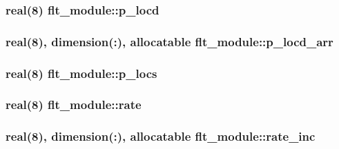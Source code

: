 \subsubsection[{p\+\_\+locd}]{\setlength{\rightskip}{0pt plus 5cm}real(8) flt\+\_\+module\+::p\+\_\+locd}\label{namespaceflt__module_a9a55926b369374d66caf682a539d8acf}
\hypertarget{namespaceflt__module_a3ae9412ace7bafcdc16443a1de523c08}{}
\subsubsection[{p\+\_\+locd\+\_\+arr}]{\setlength{\rightskip}{0pt plus 5cm}real(8), dimension(\+:), allocatable flt\+\_\+module\+::p\+\_\+locd\+\_\+arr}\label{namespaceflt__module_a3ae9412ace7bafcdc16443a1de523c08}
\hypertarget{namespaceflt__module_ac1c817f0b45b42ee735df0300075b47e}{}
\subsubsection[{p\+\_\+locs}]{\setlength{\rightskip}{0pt plus 5cm}real(8) flt\+\_\+module\+::p\+\_\+locs}\label{namespaceflt__module_ac1c817f0b45b42ee735df0300075b47e}
\hypertarget{namespaceflt__module_ac0a06739ec2f31f13ad0b2213797e9c7}{}
\subsubsection[{rate}]{\setlength{\rightskip}{0pt plus 5cm}real(8) flt\+\_\+module\+::rate}\label{namespaceflt__module_ac0a06739ec2f31f13ad0b2213797e9c7}
\hypertarget{namespaceflt__module_af4abd22305b27392695e298e409485eb}{}
\subsubsection[{rate\+\_\+inc}]{\setlength{\rightskip}{0pt plus 5cm}real(8), dimension(\+:), allocatable flt\+\_\+module\+::rate\+\_\+inc}\label{namespaceflt__module_af4abd22305b27392695e298e409485eb}
\hypertarget{namespaceflt__module_a3aa16b477093fff931adc3d47efb4391}{}
